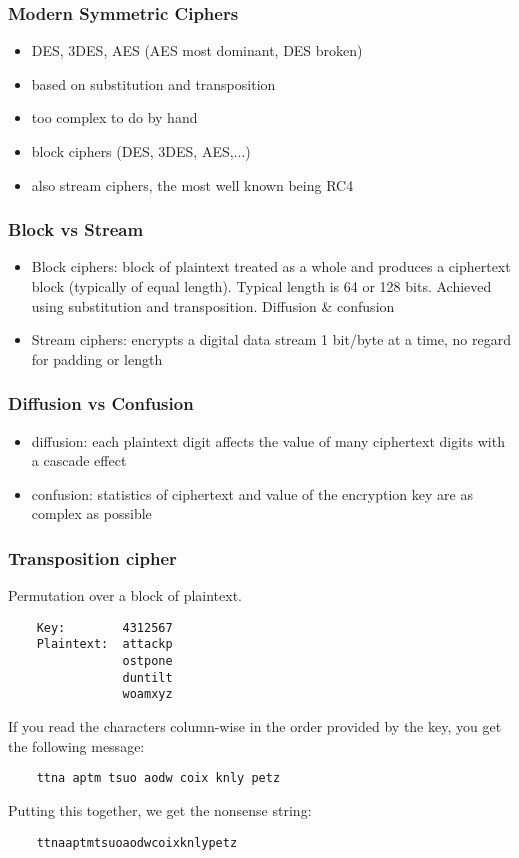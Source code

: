 \documentclass{article}
\begin{document}
\subsubsection{Modern Symmetric Ciphers}
\begin{itemize}
    \item DES, 3DES, AES (AES most dominant, DES broken)
    \item based on substitution and transposition
    \item too complex to do by hand
    \item block ciphers (DES, 3DES, AES,...)
    \item also stream ciphers, the most well known being RC4
\end{itemize}
\subsubsection{Block vs Stream}
\begin{itemize}
    \item Block ciphers: block of plaintext treated as a whole and produces a ciphertext block (typically of equal length). Typical length is 64 or 128 bits. Achieved using substitution and transposition. Diffusion \& confusion
    \item Stream ciphers: encrypts a digital data stream 1 bit/byte at a time, no regard for padding or length
\end{itemize}
\subsubsection{Diffusion vs Confusion}
\begin{itemize}
    \item diffusion: each plaintext digit affects the value of many ciphertext digits with a cascade effect
    \item confusion: statistics of ciphertext and value of the encryption key are as complex as possible
\end{itemize}
\subsubsection{Transposition cipher}
Permutation over a block of plaintext.
\begin{verbatim}
    Key:        4312567
    Plaintext:  attackp
                ostpone
                duntilt
                woamxyz
\end{verbatim}
If you read the characters column-wise in the order provided by the key, you get the following message:
\begin{verbatim}
    ttna aptm tsuo aodw coix knly petz
\end{verbatim}
Putting this together, we get the nonsense string:
\begin{verbatim}
    ttnaaptmtsuoaodwcoixknlypetz
\end{verbatim}
\end{document}
